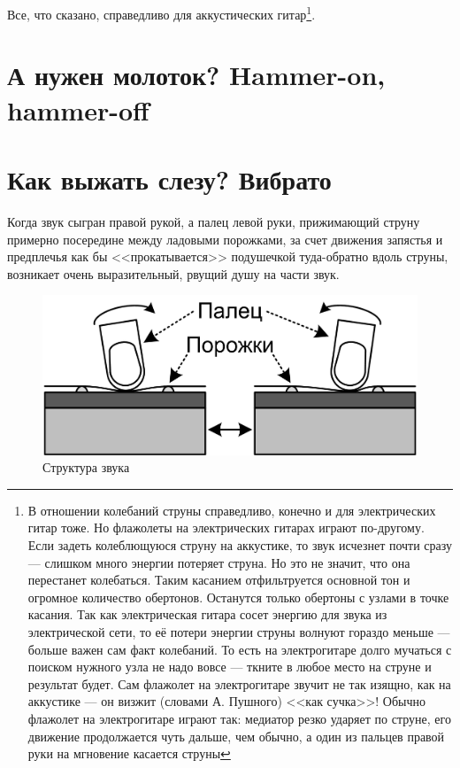 Все, что сказано, справедливо для аккустических гитар\footnote{В отношении колебаний струны справедливо, конечно и для электрических гитар тоже. Но флажолеты на электрических гитарах играют по-другому. Если задеть колеблющуюся струну на аккустике, то звук исчезнет почти сразу --- слишком много энергии потеряет струна. Но это не значит, что она перестанет колебаться. Таким касанием отфильтруется основной тон и огромное количество обертонов. Останутся только обертоны с узлами в точке касания. Так как электрическая гитара сосет энергию для звука из электрической сети, то её потери энергии струны волнуют гораздо меньше --- больше важен сам факт колебаний. То есть на электрогитаре долго мучаться с поиском нужного узла не надо вовсе --- ткните в любое место на струне и результат будет. Сам флажолет на электрогитаре звучит не так изящно, как на аккустике --- он визжит (словами А. Пушного) <<как сучка>>! Обычно флажолет на электрогитаре играют так: медиатор резко ударяет по струне, его движение продолжается чуть дальше, чем обычно, а один из пальцев правой руки на мгновение касается струны}.


\section{А нужен молоток? Hammer-on, hammer-off}



\section{Как выжать слезу? Вибрато}
\label{ch:tricks:vibrato}

Когда звук сыгран правой рукой, а палец левой руки, прижимающий струну примерно посередине между ладовыми порожками, за счет движения запястья и предплечья как бы <<прокатывается>> подушечкой туда-обратно вдоль струны, возникает очень выразительный, рвущий душу на части звук.  

\begin{figure}[!ht]
    \centering
    \includegraphics{fig/vibrato} 
    \caption{Структура звука}\label{fig:tricks:vibrato}
\end{figure}

